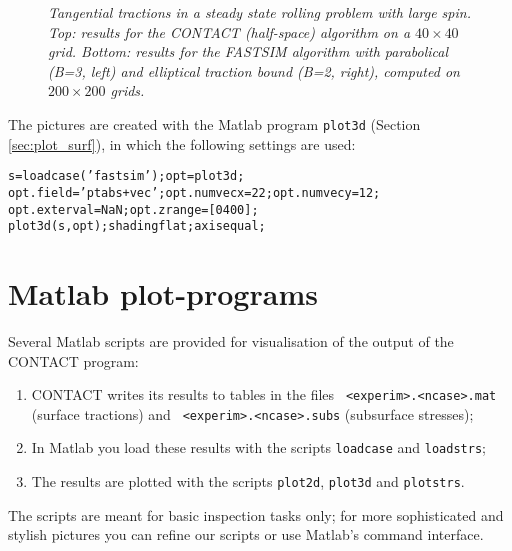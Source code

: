 \documentclass[12pt]{report}
\begin{document}
\begin{figure}[bt]
\centering
{}

\caption{\em Tangential tractions in a steady state rolling problem with
large spin. Top: results for the CONTACT
(half-space) algorithm on a $40\times 40$ grid. Bottom: results for the
FASTSIM algorithm with parabolical (B=3, left) and elliptical traction
bound (B=2, right), computed on $200\times 200$ grids.}
\label{fig:eldiv_fastsim}
\end{figure}

The pictures are created with the Matlab program {\tt plot3d} (Section
\ref{sec:plot_surf}), in which the following settings are used:
\begin{alltt}\small
s = loadcase('fastsim'); opt = plot3d;
opt.field='ptabs+vec'; opt.numvecx=22; opt.numvecy=12;
opt.exterval=NaN; opt.zrange=[0 400];
plot3d(s, opt); shading flat; axis equal;
\end{alltt}


\chapter{Matlab plot-programs}
\label{chp:matlab_plots}

Several Matlab scripts are provided for visualisation of the output of the
CONTACT program:
\begin{enumerate}
\item CONTACT writes its results to tables in the files {\tt
        <experim>.<ncase>.mat} (surface tractions) and {\tt
        <experim>.<ncase>.subs} (subsurface stresses);
\item In Matlab you load these results with the scripts {\tt loadcase} and
        {\tt loadstrs};
\item The results are plotted with the scripts {\tt plot2d}, {\tt plot3d}
        and {\tt plotstrs}.
\end{enumerate}
The scripts are meant for basic inspection tasks only; for more
sophisticated and stylish pictures you can refine our scripts or use
Matlab's command interface.
\end{document}
